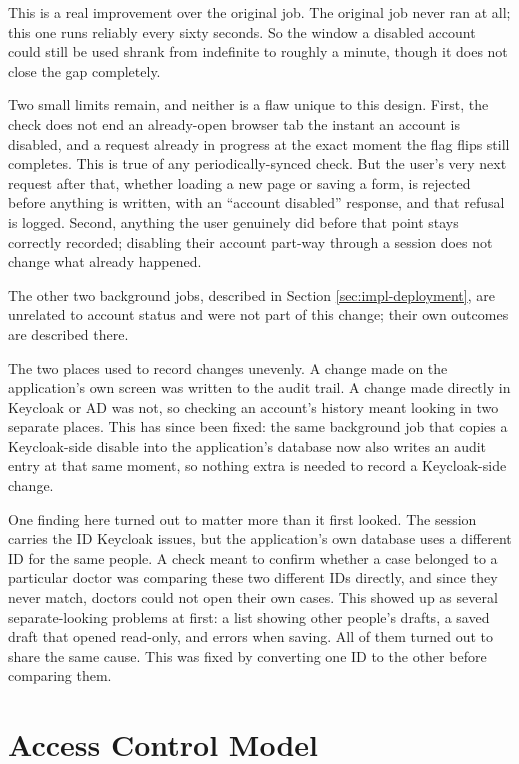 This is a real improvement over the original job. The original job never ran at all; this one runs reliably every sixty seconds. So the window a disabled account could still be used shrank from indefinite to roughly a minute, though it does not close the gap completely.

Two small limits remain, and neither is a flaw unique to this design. First, the check does not end an already-open browser tab the instant an account is disabled, and a request already in progress at the exact moment the flag flips still completes. This is true of any periodically-synced check. But the user's very next request after that, whether loading a new page or saving a form, is rejected before anything is written, with an ``account disabled'' response, and that refusal is logged. Second, anything the user genuinely did before that point stays correctly recorded; disabling their account part-way through a session does not change what already happened.

The other two background jobs, described in Section \ref{sec:impl-deployment}, are unrelated to account status and were not part of this change; their own outcomes are described there.

The two places used to record changes unevenly. A change made on the application's own screen was written to the audit trail. A change made directly in Keycloak or AD was not, so checking an account's history meant looking in two separate places. This has since been fixed: the same background job that copies a Keycloak-side disable into the application's database now also writes an audit entry at that same moment, so nothing extra is needed to record a Keycloak-side change.

One finding here turned out to matter more than it first looked. The session carries the ID Keycloak issues, but the application's own database uses a different ID for the same people. A check meant to confirm whether a case belonged to a particular doctor was comparing these two different IDs directly, and since they never match, doctors could not open their own cases. This showed up as several separate-looking problems at first: a list showing other people's drafts, a saved draft that opened read-only, and errors when saving. All of them turned out to share the same cause. This was fixed by converting one ID to the other before comparing them.

\section{Access Control Model}
\label{sec:impl-access-model}

